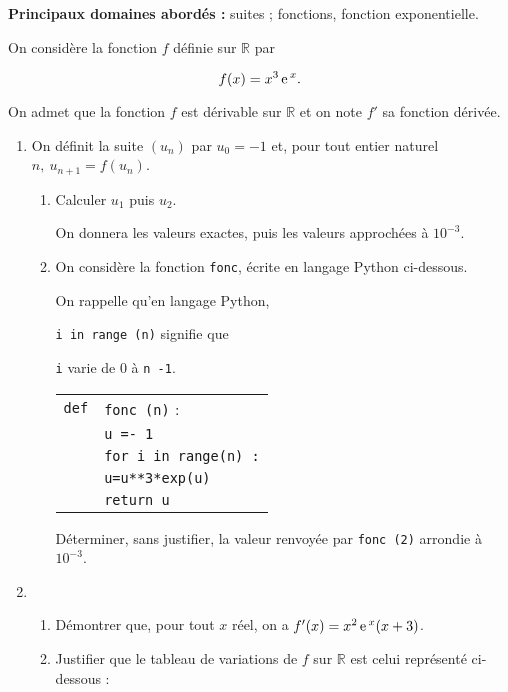 \documentclass[10pt,a4paper]{article}
\newcommand{\R}{\mathbb{R}}
\newcommand{\e}{\,\text{e\,}}%
\begin{document}
\medskip

\textbf{Principaux domaines abordés :}
suites ;
fonctions, fonction exponentielle.

\medskip

On considère la fonction $f$ définie sur $\R$ par

\[f(x) = x^3\e^x.\]

On admet que la fonction $f$ est dérivable sur $\R$ et on note $f'$ sa fonction dérivée.

\medskip

\begin{enumerate}
\item On définit la suite $\left(u_n\right)$ par $u_0 = - 1$ et, pour tout entier naturel $n,\: u_{n+1} = f\left(u_n\right)$.
	\begin{enumerate}
		\item Calculer $u_1$ puis $u_2$.
		
On donnera les valeurs exactes, puis les valeurs approchées à $10^{-3}$.
		\item On considère la fonction \texttt{fonc}, écrite en langage Python ci-dessous.

\smallskip

\begin{minipage}{0.524\linewidth}
On rappelle qu'en langage Python,

\og \texttt{i in range (n)}\fg{} signifie que 

\texttt{i} varie de 0 à \texttt{n -1}.
\end{minipage}\hfill
\begin{minipage}{0.40\linewidth}
\begin{tabular}{|l l|}\hline
\texttt{def}& \texttt{fonc (n)} :\\
&\texttt{u =- 1}\\
&\texttt{for i in range(n) :}\\
&\quad \texttt{u=u**3*exp(u)}\\
&\texttt{return u}\\\hline
\end{tabular}
\end{minipage}

Déterminer, sans justifier, la valeur renvoyée par \texttt{fonc (2)} arrondie à $10^{-3}$.
	\end{enumerate}
\item 
	\begin{enumerate}
		\item Démontrer que, pour tout $x$ réel, on a $f'(x) = x^2\e^x(x + 3)$.
		\item Justifier que le tableau de variations de $f$ sur $\R$ est celui représenté
ci-dessous :


\end{enumerate}
\end{enumerate}
\end{document}
